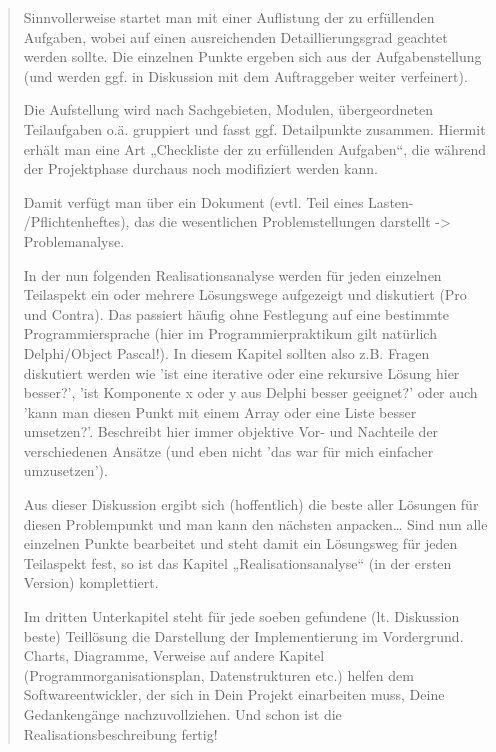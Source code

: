 \documentclass[12pt, letterpaper]{article}
\begin{document}
            \begin{verse}
                    \item Sinnvollerweise startet man mit einer Auflistung der zu erfüllenden Aufgaben, wobei auf einen ausreichenden Detaillierungsgrad geachtet werden sollte. Die einzelnen Punkte ergeben sich aus der Aufgabenstellung (und werden ggf. in Diskussion mit dem Auftraggeber weiter verfeinert).

                    \item Die Aufstellung wird nach Sachgebieten, Modulen, übergeordneten Teilaufgaben o.ä. gruppiert und fasst ggf. Detailpunkte zusammen. Hiermit erhält man eine Art „Checkliste der zu erfüllenden Aufgaben“, die während der Projektphase durchaus noch modifiziert werden kann.

                    \item Damit verfügt man über ein Dokument (evtl. Teil eines Lasten- /Pflichtenheftes), das die wesentlichen Problemstellungen darstellt -> Problemanalyse.

                    \item In der nun folgenden Realisationsanalyse werden für jeden einzelnen Teilaspekt ein oder mehrere Lösungswege aufgezeigt und diskutiert (Pro und Contra). Das passiert häufig ohne Festlegung auf eine bestimmte Programmiersprache (hier im Programmierpraktikum gilt natürlich Delphi/Object Pascal!). In diesem Kapitel sollten also z.B. Fragen diskutiert werden wie 'ist eine iterative oder eine rekursive Lösung hier besser?', 'ist Komponente x oder y aus Delphi besser geeignet?' oder auch 'kann man diesen Punkt mit einem Array oder eine Liste besser umsetzen?'. Beschreibt hier immer objektive Vor- und Nachteile der verschiedenen Ansätze (und eben nicht 'das war für mich einfacher umzusetzen').

                    \item Aus dieser Diskussion ergibt sich (hoffentlich) die beste aller Lösungen für diesen Problempunkt und man kann den nächsten anpacken… Sind nun alle einzelnen Punkte bearbeitet und steht damit ein Lösungsweg für jeden Teilaspekt fest, so ist das Kapitel „Realisationsanalyse“ (in der ersten Version) komplettiert.

                    \item Im dritten Unterkapitel steht für jede soeben gefundene (lt. Diskussion beste) Teillösung die Darstellung der Implementierung im Vordergrund. Charts, Diagramme, Verweise auf andere Kapitel (Programmorganisationsplan, Datenstrukturen etc.) helfen dem Softwareentwickler, der sich in Dein Projekt einarbeiten muss, Deine Gedankengänge nachzuvollziehen. Und schon ist die Realisationsbeschreibung fertig!


\end{verse}
\end{document}
